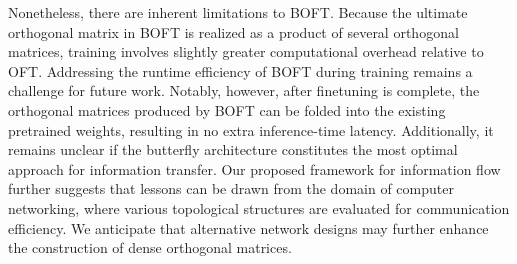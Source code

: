 Nonetheless, there are inherent limitations to BOFT. Because the ultimate orthogonal matrix in BOFT is realized as a product of several orthogonal matrices, training involves slightly greater computational overhead relative to OFT. Addressing the runtime efficiency of BOFT during training remains a challenge for future work. Notably, however, after finetuning is complete, the orthogonal matrices produced by BOFT can be folded into the existing pretrained weights, resulting in no extra inference-time latency. Additionally, it remains unclear if the butterfly architecture constitutes the most optimal approach for information transfer. Our proposed framework for information flow further suggests that lessons can be drawn from the domain of computer networking, where various topological structures are evaluated for communication efficiency. We anticipate that alternative network designs may further enhance the construction of dense orthogonal matrices.